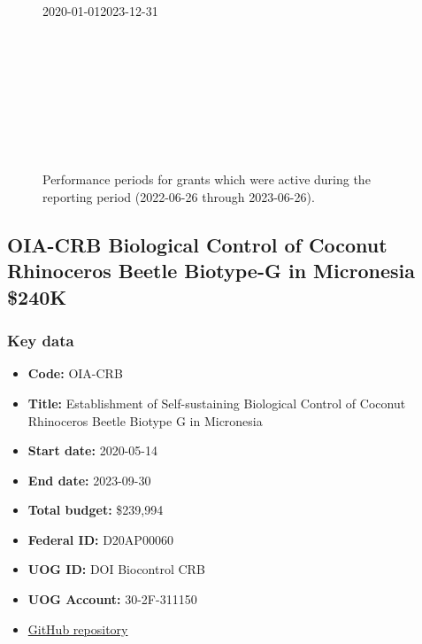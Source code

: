 \begin{figure}[h!]
	\label{gannt}
	\begin{ganttchart}[time slot format=isodate, expand chart=\textwidth]{2020-01-01}{2023-12-31}
		 \\
		 \\
		 \\
		\\
		\\
		\\
		\\		
		\\
		\\
	\end{ganttchart}
	\caption{Performance periods for grants which were active during the reporting period (2022-06-26 through 2023-06-26).}
\end{figure}

\clearpage
\subsection{OIA-CRB Biological Control of Coconut Rhinoceros Beetle Biotype-G in Micronesia \$240K}
\label{OIA-CRB}

\subsubsection{Key data}
\begin{itemize}
	\setlength\itemsep{0em}	
	\item \textbf{Code:} OIA-CRB
	\item \textbf{Title:} Establishment of Self-sustaining Biological Control of Coconut Rhinoceros Beetle Biotype G in Micronesia
	\item \textbf{Start date:} 2020-05-14
	\item \textbf{End date:} 2023-09-30
	\item \textbf{Total budget:} \$239,994
	\item \textbf{Federal ID:} D20AP00060
	\item \textbf{UOG ID:} DOI Biocontrol CRB
	\item \textbf{UOG Account:} 30-2F-311150
	\item \href{https://github.com/aubreymoore/2020-DOI-CRB-Biocontrol}{GitHub repository}
\end{itemize}


